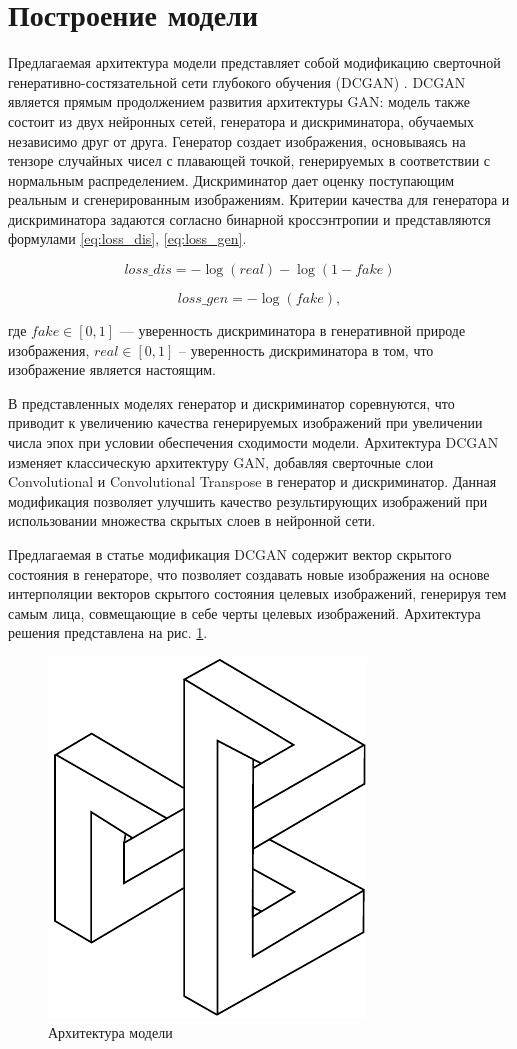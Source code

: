 \documentclass[60x84/16,8pt]{ittmm}
\begin{document}
\section{Построение модели} 
\label{sec:base-section}

Предлагаемая архитектура модели представляет собой модификацию
сверточной генеративно-состязательной сети глубокого обучения (DCGAN) \cite{dcgan}.
DCGAN является прямым продолжением развития архитектуры GAN: модель также 
состоит из двух нейронных сетей, генератора и дискриминатора, обучаемых независимо друг от друга.
Генератор создает изображения, основываясь на тензоре случайных чисел с плавающей точкой,
генерируемых в соответствии с нормальным распределением. Дискриминатор дает оценку поступающим
реальным и сгенерированным изображениям. Критерии качества для генератора и дискриминатора задаются согласно
бинарной кроссэнтропии и представляются формулами \eqref{eq:loss_dis}, \eqref{eq:loss_gen}.

\begin{equation}
  loss\_dis=-\log(real) - \log(1-fake)
  \label{eq:loss_dis}
\end{equation}

\begin{equation}
  loss\_gen=-\log(fake),
  \label{eq:loss_gen}
\end{equation}

где \(fake \in [0, 1]\) --- уверенность дискриминатора в генеративной природе изображения,
\(real \in [0, 1]\) -- уверенность дискриминатора в том, что изображение является настоящим.

В представленных моделях генератор и дискриминатор соревнуются, что приводит
к увеличению качества генерируемых изображений при увеличении числа эпох
при условии обеспечения сходимости модели. Архитектура DCGAN изменяет классическую архитектуру GAN,
добавляя сверточные слои Convolutional и Convolutional Transpose в генератор и дискриминатор.
Данная модификация позволяет улучшить качество результирующих изображений при использовании
множества скрытых слоев в нейронной сети.

Предлагаемая в статье модификация DCGAN содержит вектор скрытого состояния
в генераторе, что позволяет создавать новые изображения на основе интерполяции
векторов скрытого состояния целевых изображений, генерируя тем самым лица,
совмещающие в себе черты целевых изображений. Архитектура решения представлена
на рис. \ref{fig:architecture}.

\begin{figure}
  \centering
  \includegraphics[width=0.2\linewidth]{embl}
  \caption{Архитектура модели}
  \label{fig:architecture}
\end{figure}
\end{document}

